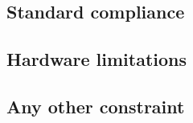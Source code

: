 \subsection{Standard compliance}

\subsection{Hardware limitations}

\subsection{Any other constraint}
